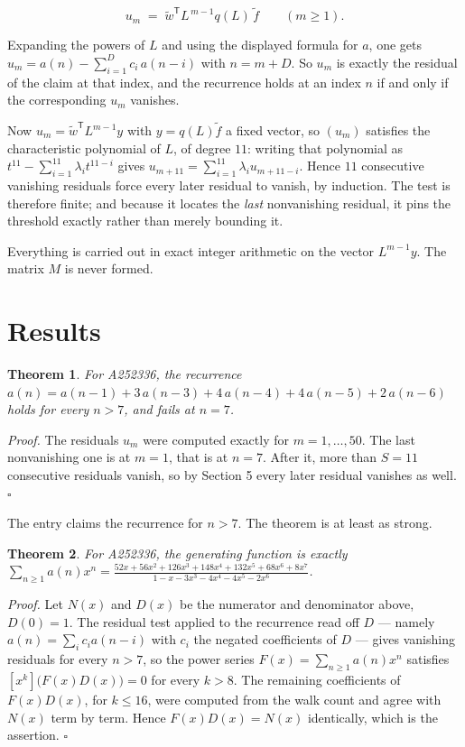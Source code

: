 \documentclass[11pt]{article}
\newtheorem{theorem}{Theorem}
\theoremstyle{definition}
\begin{document}
\[u_m \;=\; \tilde w^{\mathsf T} L^{\,m-1} q(L)\,\tilde f \qquad (m \ge 1).\]

Expanding the powers of $L$ and using the displayed formula for $a$, one gets $u_m = a(n) - \sum_{i=1}^{D} c_i\,a(n-i)$ with $n = m + D$. So $u_m$ is exactly the residual of the claim at that index, and the recurrence holds at an index $n$ if and only if the corresponding $u_m$ vanishes.

Now $u_m = \tilde w^{\mathsf T} L^{m-1} y$ with $y = q(L)\tilde f$ a fixed vector, so $(u_m)$ satisfies the characteristic polynomial of $L$, of degree $11$: writing that polynomial as $t^{11} - \sum_{i=1}^{11} \lambda_i t^{11-i}$ gives $u_{m+11} = \sum_{i=1}^{11} \lambda_i u_{m+11-i}$. Hence $11$ consecutive vanishing residuals force every later residual to vanish, by induction. The test is therefore finite; and because it locates the {\itshape last} nonvanishing residual, it pins the threshold exactly rather than merely bounding it.

Everything is carried out in exact integer arithmetic on the vector $L^{m-1}y$. The matrix $M$ is never formed.

\section{Results}

\begin{theorem} For A252336, the recurrence $a(n) = a(n-1) + 3\,a(n-3) + 4\,a(n-4) + 4\,a(n-5) + 2\,a(n-6)$ holds for every $n > 7$, and fails at $n = 7$.\end{theorem}

{\itshape Proof.} The residuals $u_m$ were computed exactly for $m = 1,\dots,50$. The last nonvanishing one is at $m = 1$, that is at $n = 7$. After it, more than $S = 11$ consecutive residuals vanish, so by Section 5 every later residual vanishes as well. $\square$

The entry claims the recurrence for $n > 7$. The theorem is at least as strong.

\begin{theorem} For A252336, the generating function is exactly $\sum_{n\ge 1} a(n)x^n = \frac{52x + 56x^{2} + 126x^{3} + 148x^{4} + 132x^{5} + 68x^{6} + 8x^{7}}{1 - x - 3x^{3} - 4x^{4} - 4x^{5} - 2x^{6}}$.\end{theorem}

{\itshape Proof.} Let $N(x)$ and $D(x)$ be the numerator and denominator above, $D(0)=1$. The residual test applied to the recurrence read off $D$ --- namely $a(n) = \sum_i c_i a(n-i)$ with $c_i$ the negated coefficients of $D$ --- gives vanishing residuals for every $n > 7$, so the power series $F(x)=\sum_{n\ge 1}a(n)x^n$ satisfies $[x^k]\bigl(F(x)D(x)\bigr) = 0$ for every $k > 8$. The remaining coefficients of $F(x)D(x)$, for $k \le 16$, were computed from the walk count and agree with $N(x)$ term by term. Hence $F(x)D(x) = N(x)$ identically, which is the assertion. $\square$
\end{document}
